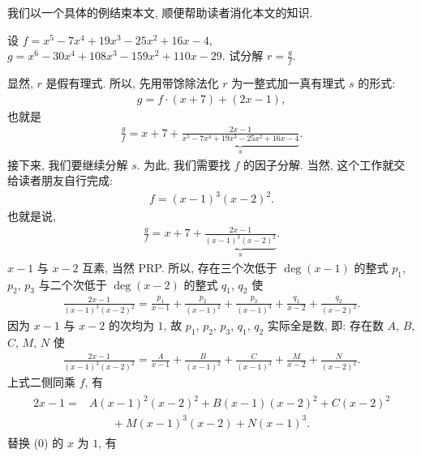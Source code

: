 我们以一个具体的例结束本文, 顺便帮助读者消化本文的知识.

\begin{example}
    设 $f = x^5 - 7x^4 + 19x^3 - 25x^2 + 16x - 4$, $g = x^6 - 30x^4 + 108x^3 - 159x^2 + 110x - 29$. 试分解 $r = \frac{g}{f}$.

    显然, $r$ 是假有理式. 所以, 先用带馀除法化 $r$ 为一整式加一真有理式 $s$ 的形式:
    \begin{align*}
        g = f \cdot (x + 7) + (2x - 1),
    \end{align*}
    也就是
    \begin{align*}
        \frac{g}{f} = x + 7 + {\underbrace{\frac{2x - 1}{x^5 - 7x^4 + 19x^3 - 25x^2 + 16x - 4}}_{s}}.
    \end{align*}
    接下来, 我们要继续分解 $s$. 为此, 我们需要找 $f$ 的因子分解. 当然, 这个工作就交给读者朋友自行完成:
    \begin{align*}
        f = (x - 1)^3 (x - 2)^2.
    \end{align*}
    也就是说,
    \begin{align*}
        \frac{g}{f} = x + 7 + {\underbrace{\frac{2x - 1}{(x - 1)^3 (x - 2)^2}}_{s}}.
    \end{align*}
    $x - 1$ 与 $x - 2$ 互素, 当然 PRP. 所以, 存在三个次低于 $\deg {(x - 1)}$ 的整式 $p_1$, $p_2$, $p_3$ 与二个次低于 $\deg {(x - 2)}$ 的整式 $q_1$, $q_2$ 使
    \begin{align*}
        \frac{2x - 1}{(x - 1)^3 (x - 2)^2} = \frac{p_1}{x - 1} + \frac{p_2}{(x - 1)^2} + \frac{p_3}{(x - 1)^3} + \frac{q_1}{x - 2} + \frac{q_2}{(x - 2)^2}.
    \end{align*}
    因为 $x - 1$ 与 $x - 2$ 的次均为 $1$, 故 $p_1$, $p_2$, $p_3$, $q_1$, $q_2$ 实际全是数, 即: 存在数 $A$, $B$, $C$, $M$, $N$ 使
    \begin{align*}
        \frac{2x - 1}{(x - 1)^3 (x - 2)^2} = \frac{A}{x - 1} + \frac{B}{(x - 1)^2} + \frac{C}{(x - 1)^3} + \frac{M}{x - 2} + \frac{N}{(x - 2)^2}.
    \end{align*}
    上式二侧同乘 $f$, 有
    \begin{align*}
        \tag*{(0)} \begin{aligned}
            2x - 1
            = {} & A (x - 1)^2 (x - 2)^2 + B (x - 1) (x - 2)^2 + C (x - 2)^2 \\
                 & \qquad + M (x - 1)^3 (x - 2) + N (x - 1)^3.
        \end{aligned}
    \end{align*}
    替换 (0) 的 $x$ 为 $1$, 有
    \begin{align*}

\end{align*}
\end{example}
